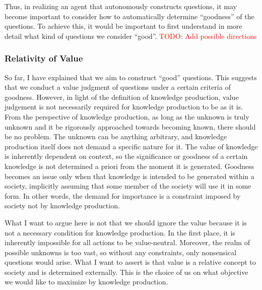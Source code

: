 \documentclass{book}
\begin{document}
Thus, in realizing an agent that autonomously constructs questions, it may become important to consider how to automatically determine ``goodness'' of the questions. To achieve this, it would be important to first understand in more detail what kind of questions we consider ``good''. \textcolor{red}{TODO: Add possible directions}


\subsubsection{Relativity of Value}

So far, I have explained that we aim to construct ``good'' questions. This suggests that we conduct a value judgment of questions under a certain criteria of goodness. However, in light of the definition of knowledge production, value judgement is not necessarily required for knowledge production to be as it is. From the perspective of knowledge production, as long as the unknown is truly unknown and it be rigorously approached towards becoming known, there should be no problem. The unknown can be anything arbitrary, and knowledge production itself does not demand a specific nature for it. The value of knowledge is inherently dependent on context, so the significance or goodness of a certain knowledge is not determined a priori from the moment it is generated. Goodness becomes an issue only when that knowledge is intended to be generated within a society, implicitly assuming that some member of the society will use it in some form. In other words, the demand for importance is a constraint imposed by society not by knowledge production.

What I want to argue here is not that we should ignore the value because it is not a necessary condition for knowledge production. In the first place, it is inherently impossible for all actions to be value-neutral. Moreover, the realm of possible unknowns is too vast, so without any constraints, only nonsensical questions would arise. What I want to assert is that value is a relative concept to society and is determined externally. This is the choice of us on what objective we would like to maximize by knowledge production.
\end{document}
